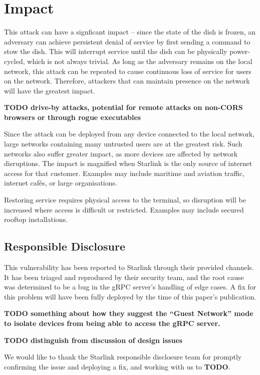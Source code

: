 \section{Impact}\label{sec:impact}

This attack can have a signficant impact -- since the state of the dish is frozen, an adversary can achieve persistent denial of service by first sending a command to stow the dish.
This will interrupt service until the dish can be physically power-cycled, which is not always trivial.
As long as the adversary remains on the local network, this attack can be repeated to cause continuous loss of service for users on the network.
Therefore, attackers that can maintain presence on the network will have the greatest impact.

\textbf{TODO drive-by attacks, potential for remote attacks on non-CORS browsers or through rogue executables}

Since the attack can be deployed from any device connected to the local network, large networks containing many untrusted users are at the greatest risk.
Such networks also suffer greater impact, as more devices are affected by network disruptions.
The impact is magnified when Starlink is the only source of internet access for that customer.
Examples may include maritime and aviation traffic, internet cafés, or large organisations.

Restoring service requires physical access to the terminal, so disruption will be increased where access is difficult or restricted.
Examples may include secured rooftop installations.

\subsection{Responsible Disclosure}\label{sec:responsible-disclosure}

This vulnerability has been reported to Starlink through their provided channels.
It has been triaged and reproduced by their security team, and the root cause was determined to be a bug in the gRPC server's handling of edge cases.
A fix for this problem will have been fully deployed by the time of this paper's publication.

\textbf{TODO something about how they suggest the ``Guest Network'' mode to isolate devices from being able to access the gRPC server.}

\textbf{TODO distinguish from discussion of design issues}

We would like to thank the Starlink responsible disclosure team for promptly confirming the issue and deploying a fix, and working with us to \textbf{TODO}.